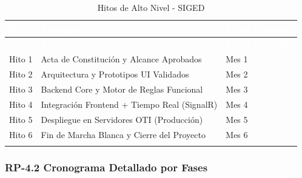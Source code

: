 \documentclass[12pt,a4paper]{article}
\begin{document}
\begin{longtable}{|>{\centering\arraybackslash}p{2cm}|>{\raggedright\arraybackslash}p{9cm}|>{\centering\arraybackslash}p{3cm}|}
\hline
\rowcolor{headerblue}
\textcolor{white}{\textbf{Hito}} & \textcolor{white}{\textbf{Entregable Clave}} & \textcolor{white}{\textbf{Fecha Estimada}} \\
\hline
\endfirsthead
\hline
\rowcolor{headerblue}
\textcolor{white}{\textbf{Hito}} & \textcolor{white}{\textbf{Entregable Clave}} & \textcolor{white}{\textbf{Fecha Estimada}} \\
\hline
\endhead
\hline
\endlastfoot

Hito 1 & Acta de Constitución y Alcance Aprobados & Mes 1 \\
\hline
\rowcolor{rowgray}
Hito 2 & Arquitectura y Prototipos UI Validados & Mes 2 \\
\hline
Hito 3 & Backend Core y Motor de Reglas Funcional & Mes 3 \\
\hline
\rowcolor{rowgray}
Hito 4 & Integración Frontend + Tiempo Real (SignalR) & Mes 4 \\
\hline
Hito 5 & Despliegue en Servidores OTI (Producción) & Mes 5 \\
\hline
\rowcolor{rowgray}
Hito 6 & Fin de Marcha Blanca y Cierre del Proyecto & Mes 6 \\
\hline
\caption{Hitos de Alto Nivel - SIGED}
\end{longtable}

\subsubsection{RP-4.2 Cronograma Detallado por Fases}
\end{document}
